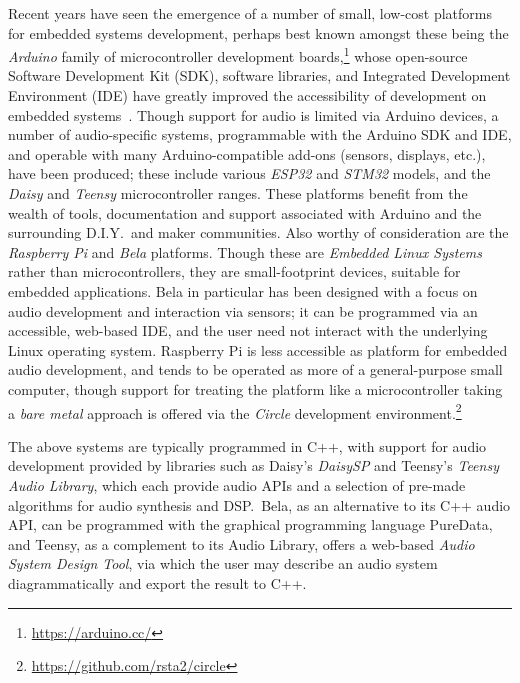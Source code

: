 \documentclass[utf8]{FrontiersinHarvard}
\begin{document}
    Recent years have seen the emergence of a number of small, low-cost
    platforms for embedded systems development, perhaps best known amongst these
    being the \textit{Arduino} family of microcontroller development
    boards,\footnote{
        \url{https://arduino.cc/}
    } whose open-source Software Development Kit
    (SDK), software libraries, and Integrated Development Environment (IDE) have
    greatly improved the accessibility of development on embedded
    systems~\citep{michon_embedded_2020}.
    Though support for audio is limited via Arduino devices, a number of
    audio-specific systems, programmable with the Arduino SDK and IDE, and
    operable with many Arduino-compatible add-ons (sensors, displays, etc.),
    have been produced;
    these include various \textit{ESP32} and \textit{STM32} models, and the
    \textit{Daisy} and \textit{Teensy} microcontroller ranges.
    These platforms benefit from the wealth of tools, documentation and support
    associated with Arduino and the surrounding D.I.Y.\ and maker communities.
    Also worthy of consideration are the \textit{Raspberry Pi} and \textit{Bela}
    platforms.
    Though these are \textit{Embedded Linux Systems} rather than
    microcontrollers, they are small-footprint devices, suitable for embedded
    applications.
    Bela in particular has been designed with a focus on audio development and
    interaction via sensors; it can be programmed via an accessible, web-based
    IDE, and the user need not interact with the underlying Linux operating
    system.
    Raspberry Pi is less accessible as platform for embedded audio development,
    and tends to be operated as more of a general-purpose small computer, though
    support for treating the platform like a microcontroller \textemdash{}
    taking a \textit{bare metal} approach \textemdash{} is offered via the
    \textit{Circle} development environment.\footnote{\url{https://github.com/rsta2/circle}}

    The above systems are typically programmed in C++, with support for audio
    development provided by libraries such as Daisy's \textit{DaisySP} and Teensy's
    \textit{Teensy Audio Library}, which each provide audio APIs and a selection of
    pre-made algorithms for audio synthesis and DSP.\
    Bela, as an alternative to its C++ audio API, can be programmed with the
    graphical programming language PureData, and Teensy, as a complement to its
    Audio Library, offers a web-based \textit{Audio System Design Tool}, via which
    the user may describe an audio system diagrammatically and export the result to
    C++.
\end{document}
